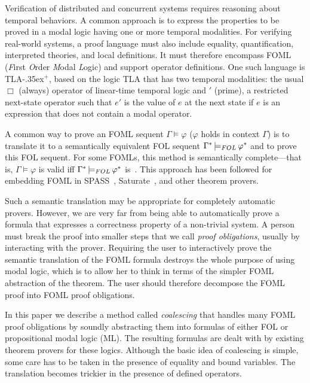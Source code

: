 \documentclass{easychair}
\newcommand{\tlaplus}{\mbox{TLA\kern -.35ex$^+$}\xspace}
\newcommand{\FOL}[1]{\ensuremath{#1_{\textit{\scriptsize FOL}}}}
\newcommand{\folmodels}{\mathop{\models_{\textit{\scriptsize FOL}}}}
\newcommand{\edmargin}[2]{\marginpar{\raggedright\footnotesize\color{red}#1: #2}}
\newcommand{\edmargin}[2]{}
\def\llmargin{\edmargin{LL}}
\def\smmargin{\edmargin{SM}}
\begin{document}
Verification of distributed and concurrent systems requires reasoning
about temporal behaviors.  A common approach is to express the
properties to be proved in a modal logic having one or more temporal
modalities.  For verifying real-world systems, a proof language must
%
%
also include equality, quantification, interpreted theories,
and local definitions.  It must
therefore encompass FOML (\emph{F}irst \emph{O}rder \emph{M}odal
\emph{L}ogic) and support operator definitions.  One such language is
\tlaplus \cite{lamport:tla+}, based on the logic TLA
that has two temporal modalities: the
usual $\Box$ (always) operator of linear-time temporal logic and 
$'$ (prime), a
%
%
restricted next-state operator such that $e'$ is the value of
$e$ at the next state if $e$ is an expression that does not contain a
modal operator.

A common way to prove an FOML sequent
$\Gamma\models\varphi$ ($\varphi$ holds in context $\Gamma$)
is to translate it to a semantically equivalent FOL sequent
$\Gamma^* \folmodels \varphi^*$
%
%
and to prove this FOL sequent.  For some FOMLs, this method is
semantically complete---that is, $\Gamma\models\varphi$ is valid iff
$\Gamma^* \folmodels \varphi^*$ is~\cite{ohlbach:translation}.
This approach has been followed for embedding FOML in
SPASS~\cite{hustadt:mspass}, Saturate~\cite{ganzinger:saturate}, and other theorem
provers.

Such a semantic translation may be appropriate for completely
automatic provers.  However, we are very far from being able to
automatically prove a formula that expresses a correctness property of
a non-trivial system.  A person must break the proof into smaller
steps that we call \emph{proof obligations}, usually by interacting
with the prover.  Requiring the user to interactively prove the
semantic translation of the FOML formula destroys the whole purpose of
using modal logic, which is to allow her to think in terms of the
simpler FOML abstraction of the theorem.  The user should therefore
decompose the FOML proof into FOML proof obligations.

In this paper we describe a method called \emph{coalescing} that handles many
FOML proof obligations by soundly abstracting them into formulas of either FOL
or propositional modal logic (ML). The resulting formulas are dealt with by
existing theorem provers for these logics. Although the basic idea of coalescing
is simple, some care has to be taken in the presence of equality and bound
variables. The translation becomes trickier in the presence of defined
operators.
\end{document}

